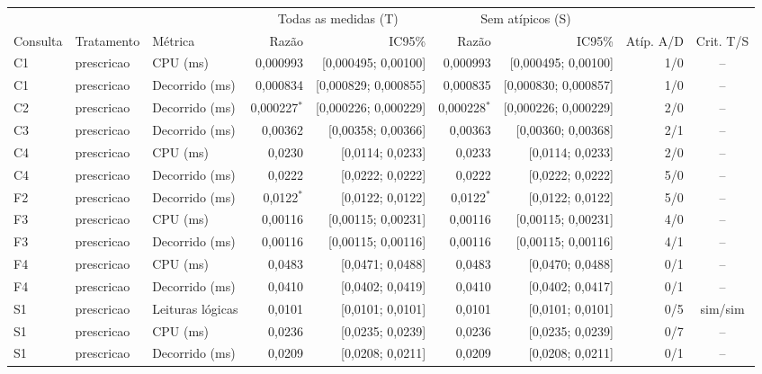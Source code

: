 {\scriptsize\setlength{\tabcolsep}{4pt}
\begin{tabular}{lllrrrrrc}
\toprule
 &  &  & \multicolumn{2}{c}{Todas as medidas (T)} & \multicolumn{2}{c}{Sem atípicos (S)} &  &  \\
\cmidrule(lr){4-5}\cmidrule(lr){6-7}
Consulta & Tratamento & Métrica & Razão & IC95\% & Razão & IC95\% & Atíp. A/D & Crit. T/S \\
\midrule
C1 & prescricao & CPU (ms) & 0,000993 & [0,000495; 0,00100] & 0,000993 & [0,000495; 0,00100] & 1/0 & -- \\
C1 & prescricao & Decorrido (ms) & 0,000834 & [0,000829; 0,000855] & 0,000835 & [0,000830; 0,000857] & 1/0 & -- \\
C2 & prescricao & Decorrido (ms) & 0,000227$^{*}$ & [0,000226; 0,000229] & 0,000228$^{*}$ & [0,000226; 0,000229] & 2/0 & -- \\
C3 & prescricao & Decorrido (ms) & 0,00362 & [0,00358; 0,00366] & 0,00363 & [0,00360; 0,00368] & 2/1 & -- \\
C4 & prescricao & CPU (ms) & 0,0230 & [0,0114; 0,0233] & 0,0233 & [0,0114; 0,0233] & 2/0 & -- \\
C4 & prescricao & Decorrido (ms) & 0,0222 & [0,0222; 0,0222] & 0,0222 & [0,0222; 0,0222] & 5/0 & -- \\
F2 & prescricao & Decorrido (ms) & 0,0122$^{*}$ & [0,0122; 0,0122] & 0,0122$^{*}$ & [0,0122; 0,0122] & 5/0 & -- \\
F3 & prescricao & CPU (ms) & 0,00116 & [0,00115; 0,00231] & 0,00116 & [0,00115; 0,00231] & 4/0 & -- \\
F3 & prescricao & Decorrido (ms) & 0,00116 & [0,00115; 0,00116] & 0,00116 & [0,00115; 0,00116] & 4/1 & -- \\
F4 & prescricao & CPU (ms) & 0,0483 & [0,0471; 0,0488] & 0,0483 & [0,0470; 0,0488] & 0/1 & -- \\
F4 & prescricao & Decorrido (ms) & 0,0410 & [0,0402; 0,0419] & 0,0410 & [0,0402; 0,0417] & 0/1 & -- \\
S1 & prescricao & Leituras lógicas & 0,0101 & [0,0101; 0,0101] & 0,0101 & [0,0101; 0,0101] & 0/5 & sim/sim \\
S1 & prescricao & CPU (ms) & 0,0236 & [0,0235; 0,0239] & 0,0236 & [0,0235; 0,0239] & 0/7 & -- \\
S1 & prescricao & Decorrido (ms) & 0,0209 & [0,0208; 0,0211] & 0,0209 & [0,0208; 0,0211] & 0/1 & -- \\

\end{tabular}}
